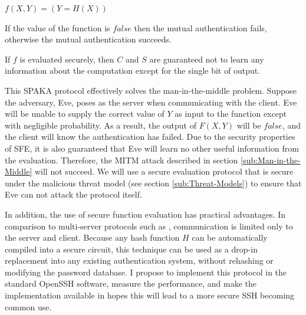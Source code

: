 $f(X,Y)=\left(Y=H\left(X\right)\right)$

If the value of the function is $false$ then the mutual authentication
fails, otherwise the mutual authentication succeeds.

If $f$ is evaluated securely, then $C$ and $S$ are guaranteed not
to learn any information about the computation except for the single
bit of output. 

This SPAKA protocol effectively solves the man-in-the-middle problem.
Suppose the adversary, Eve, poses as the server when communicating
with the client. Eve will be unable to supply the correct value of
$Y$ as input to the function except with negligible probability.
As a result, the output of $F(X,Y)$ will be $false$, and the client
will know the authentication has failed. Due to the security properties
of SFE, it is also guaranteed that Eve will learn no other useful
information from the evaluation. Therefore, the MITM attack described
in section \ref{sub:Man-in-the-Middle} will not succeed. We will
use a secure evaluation protocol that is secure under the malicious
threat model (see section \ref{sub:Threat-Models}) to ensure that
Eve can not attack the protocol itself.

In addition, the use of secure function evaluation has practical advantages.
In comparison to multi-server protocols such as \cite{brainard03},
communication is limited only to the server and client. Because any
hash function $H$ can be automatically compiled into a secure circuit,
this technique can be used as a drop-in replacement into any existing
authentication system, without rehashing or modifying the password
database. I propose to implement this protocol in the standard OpenSSH
software, measure the performance, and make the implementation available
in hopes this will lead to a more secure SSH becoming common use.

%

{}

%

{}
